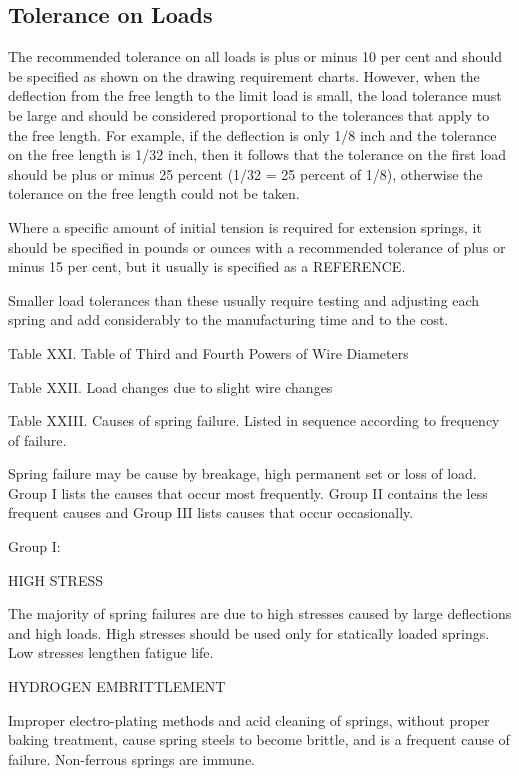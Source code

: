 \documentclass[10pt]{article}
\begin{document}
\subsection{Tolerance on Loads} %
The recommended tolerance on all loads is plus or minus 10 per cent and should be specified as shown on the drawing requirement charts. 
However, when the deflection from the free length to the limit load is small, the load tolerance must be large and should be considered proportional to the tolerances that apply to the free length. 
For example, if the deflection is only 1/8 inch and the tolerance on the free length is 1/32 inch, then it follows that the tolerance on the first load should be plus or minus 25 percent (1/32 = 25 percent of 1/8), otherwise the tolerance on the free length could not be taken.

Where a specific amount of initial tension is required for extension springs, it should be specified in pounds or ounces with a recommended tolerance of plus or minus 15 per cent, but it usually is specified as a REFERENCE.

Smaller load tolerances than these usually require testing and adjusting each spring and add considerably to the manufacturing time and to the cost.

Table XXI. Table of Third and Fourth Powers of Wire Diameters

Table XXII. Load changes due to slight wire changes

\clearpage

Table XXIII. Causes of spring failure. Listed in sequence according to frequency of failure.


Spring failure may be cause by breakage, high permanent set or loss of load.
Group I lists the causes that occur most frequently.
Group II contains the less frequent causes and Group III lists causes that occur occasionally.


Group I:

HIGH STRESS

The majority of spring failures are due to high stresses caused by large deflections and high loads. 
High stresses should be used only for statically loaded springs. 
Low stresses lengthen fatigue life.

HYDROGEN EMBRITTLEMENT

Improper electro-plating methods and acid cleaning of springs, without proper baking treatment, cause spring steels to become brittle, and is a frequent cause of failure. 
Non-ferrous springs are immune.
\end{document}
